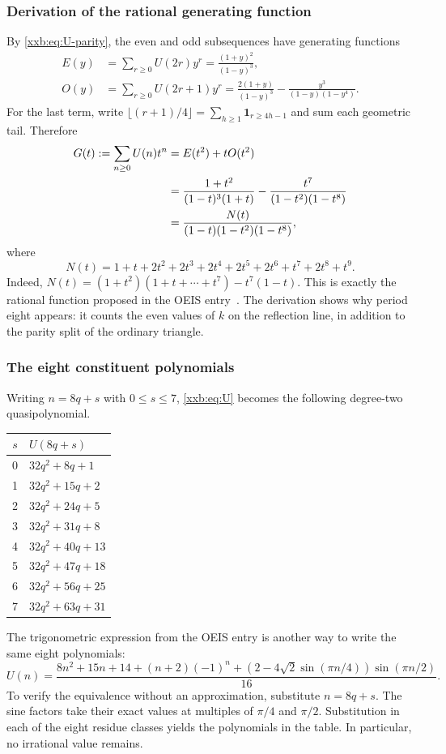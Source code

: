 \documentclass[11pt,a4paper]{article}
\numberwithin{equation}{section}
\theoremstyle{definition}
\theoremstyle{remark}
\theoremstyle{plain}
\newcommand{\U}{U}
\begin{document}
\subsubsection{Derivation of the rational generating function}
By \eqref{xxb:eq:U-parity}, the even and odd subsequences have generating
functions
\begin{align}
 E(y)&=\sum_{r\ge0}\U(2r)y^r
       =\frac{(1+y)^2}{(1-y)^3},\label{xxb:eq:E}\\
 O(y)&=\sum_{r\ge0}\U(2r+1)y^r
       =\frac{2(1+y)}{(1-y)^3}
          -\frac{y^3}{(1-y)(1-y^4)}.\label{xxb:eq:O}
\end{align}
For the last term, write
$\lfloor(r+1)/4\rfloor=\sum_{h\ge1}\mathbf1_{r\ge4h-1}$ and sum each
geometric tail. Therefore
\begin{align}
 G(t):=\sum_{n\ge0}\U(n)t^n
 &=E(t^2)+tO(t^2)\notag\\
 &=\frac{1+t^2}{(1-t)^3(1+t)}
       -\frac{t^7}{(1-t^2)(1-t^8)}\notag\\
 &=\frac{N(t)}{(1-t)(1-t^2)(1-t^8)},\label{xxb:eq:GF}
\end{align}
where
\begin{equation}\label{xxb:eq:N}
 N(t)=1+t+2t^2+2t^3+2t^4+2t^5+2t^6+t^7+2t^8+t^9.
\end{equation}
Indeed,
$N(t)=(1+t^2)(1+t+\cdots+t^7)-t^7(1-t)$.
This is exactly the rational function proposed in the OEIS entry~\cite{oeis290268}.
The derivation shows why period eight appears: it counts the even values
of $k$ on the reflection line, in addition to the parity split of the
ordinary triangle.

\subsubsection{The eight constituent polynomials}
Writing $n=8q+s$ with $0\le s\le7$, \eqref{xxb:eq:U} becomes the following
degree-two quasipolynomial.
\begin{center}
\begin{tabular}{cl}
\toprule
$s$ & $\U(8q+s)$\\
\midrule
0 & $32q^2+8q+1$\\
1 & $32q^2+15q+2$\\
2 & $32q^2+24q+5$\\
3 & $32q^2+31q+8$\\
4 & $32q^2+40q+13$\\
5 & $32q^2+47q+18$\\
6 & $32q^2+56q+25$\\
7 & $32q^2+63q+31$\\
\bottomrule
\end{tabular}
\end{center}
The trigonometric expression from the OEIS entry is another way to write
the same eight polynomials:
\begin{equation}\label{xxb:eq:trig}
 \U(n)=\frac{8n^2+15n+14+(n+2)(-1)^n
 +(2-4\sqrt2\sin(\pi n/4))\sin(\pi n/2)}{16}.
\end{equation}
To verify the equivalence without an approximation, substitute $n=8q+s$.
The sine factors take their exact values at multiples of $\pi/4$ and
$\pi/2$. Substitution in each of the eight residue classes yields the
polynomials in the table. In particular, no irrational value remains.
\end{document}
